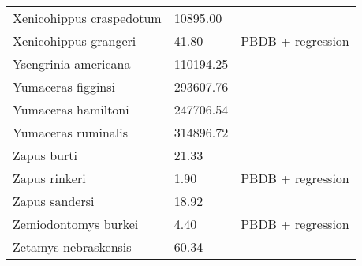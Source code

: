 \documentclass{article}
\begin{document}
\begin{center}
\begin{longtable}{p{} p{} p{}}
    Xenicohippus craspedotum & 10895.00 & \cite{McKenna2011} \\ 
    Xenicohippus grangeri & 41.80 & PBDB + regression \\ 
    Ysengrinia americana & 110194.25 & \cite{Tomiya2013} \\ 
    Yumaceras figginsi & 293607.76 & \cite{Tomiya2013} \\ 
    Yumaceras hamiltoni & 247706.54 & \cite{Tomiya2013} \\ 
    Yumaceras ruminalis & 314896.72 & \cite{Tomiya2013} \\ 
    Zapus burti & 21.33 & \cite{Tomiya2013} \\ 
    Zapus rinkeri & 1.90 & PBDB + regression \\ 
    Zapus sandersi & 18.92 & \cite{Tomiya2013} \\ 
    Zemiodontomys burkei & 4.40 & PBDB + regression \\ 
    Zetamys nebraskensis & 60.34 & \cite{Tomiya2013} \\ 
  \end{longtable}
\end{center}

\end{document}

